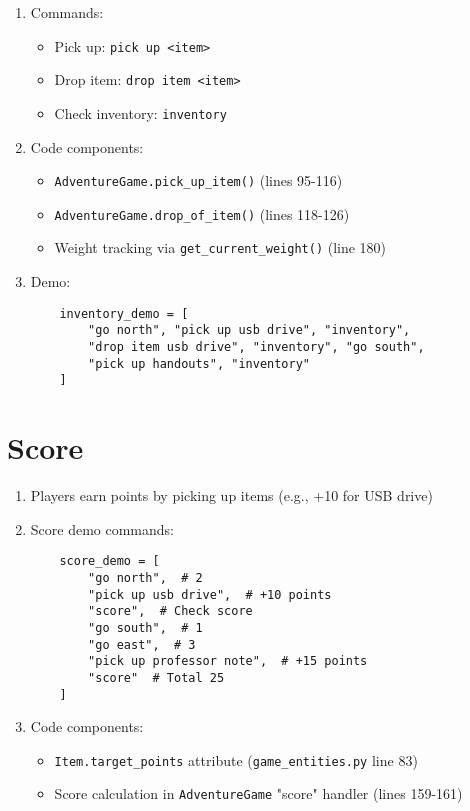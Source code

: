 \documentclass[11pt]{article}
\begin{document}
\begin{enumerate}
    \item Commands:
    \begin{itemize}
        \item Pick up: \texttt{pick up <item>}
        \item Drop item: \texttt{drop item <item>}
        \item Check inventory: \texttt{inventory}
    \end{itemize}
    \item Code components:
    \begin{itemize}
        \item \texttt{AdventureGame.pick\_up\_item()} (lines 95-116)
        \item \texttt{AdventureGame.drop\_of\_item()} (lines 118-126)
        \item Weight tracking via \texttt{get\_current\_weight()} (line 180)
    \end{itemize}
    \item Demo:
    \begin{verbatim}
    inventory_demo = [
        "go north", "pick up usb drive", "inventory",
        "drop item usb drive", "inventory", "go south",
        "pick up handouts", "inventory"
    ]
    \end{verbatim}
\end{enumerate}

\section*{Score}
\begin{enumerate}
    \item Players earn points by picking up items (e.g., +10 for USB drive)
    \item Score demo commands:
    \begin{verbatim}
    score_demo = [
        "go north",  # 2
        "pick up usb drive",  # +10 points
        "score",  # Check score
        "go south",  # 1
        "go east",  # 3
        "pick up professor note",  # +15 points
        "score"  # Total 25
    ]
    \end{verbatim}
    \item Code components:
    \begin{itemize}
        \item \texttt{Item.target\_points} attribute (\texttt{game\_entities.py} line 83)
        \item Score calculation in \texttt{AdventureGame} "score" handler (lines 159-161)
    \end{itemize}
\end{enumerate}
\end{document}
